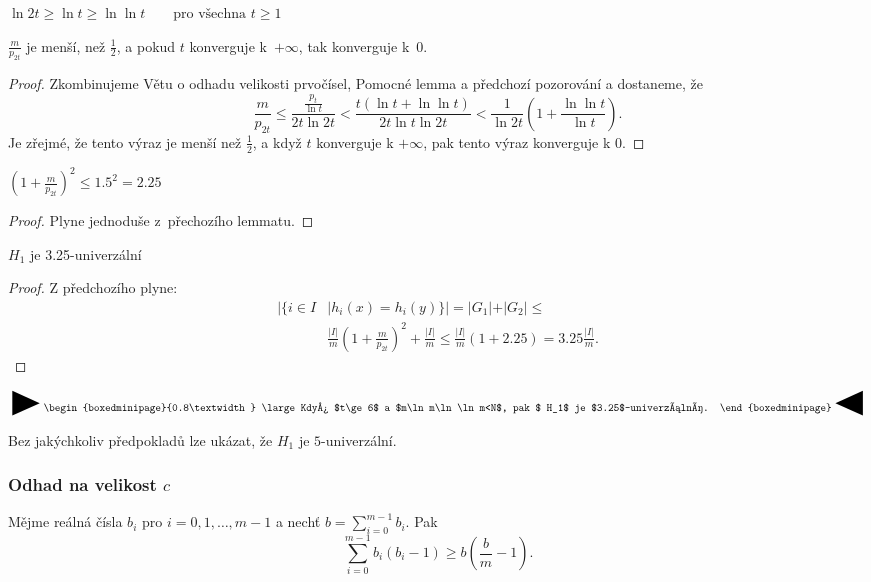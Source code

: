 \documentclass[a4paper,12pt]{article}
\newcommand{\zapamatovat}[1]{
 {
 
 \setlength\fboxrule{5pt}
 \begin{center}
 $\vcenter{
 \hbox{\raisebox{-0.8ex}{\scalebox{1.7}{\Huge\RIGHTarrow}}\begin{boxedminipage}{0.8\textwidth}
\large #1
 \end{boxedminipage}\raisebox{-0.8ex}{\scalebox{1.7}{\Huge\LEFTarrow}}}}$
 \end{center}
 }
 }
\begin{document}
\begin{pozorovani}
$\ln2t\ge\ln t\ge\ln\ln t\qquad\text{pro všechna }t\ge 1$
\end{pozorovani}

\begin{lemma}
    $\frac m{p_{2t}}$ je menší, než $\frac 12$, a pokud $t$ konverguje k~$+\infty$, tak konverguje k~$0$.
\end{lemma}
\begin{proof}
Zkombinujeme Větu o odhadu velikosti prvočísel, 
Pomocné lemma a předchozí pozorování 
a dostaneme, že
$$\frac m{p_{2t}}\le\frac {\frac {p_t}{\ln t}}{2t\ln2t}<\frac {t(\ln 
t+\ln\ln t)}{2t\ln t\ln2t}<\frac 1{\ln2t}(1+\frac {\ln\ln t}{\ln 
t}).$$
Je zřejmé, že tento výraz je menší než $\frac 
12$, 
a když $t$ konverguje k $+\infty$, pak tento výraz konverguje k $
0$.
\end{proof}

\begin{lemma}
    $(1+\frac m{p_{2t}})^2\le 1.5^2=2.25$
\end{lemma} 
\begin{proof}
    Plyne jednoduše z~přechozího lemmatu.
\end{proof}

\begin{veta}
    $H_1$ je 3.25-univerzální
\end{veta}
\begin{proof}
    Z předchozího plyne:
    \begin{align*}|\{i\in I&\mid h_i(x)=h_i(y)\}|=|G_1|+|G_2|\le\\
    &\frac {|I|}m(1+\frac m{p_{2t}})^2+\frac {|I|}m\le\frac {|I|}m(1+
    2.25)=3.25\frac {|I|}m.\end{align*}
\end{proof}

\zapamatovat{
Když $t\ge 6$ a $m\ln m\ln\ln m<N$, pak $
H_1$ je 
$3.25$-univerzální. 
}

Bez jakýchkoliv předpokladů lze 
ukázat, že $H_1$ je $5$-univerzální.

\subsubsection{Odhad na velikost $c$}

\begin{lemma}Mějme reálná čísla $b_i$ pro $i=0,1
,\dots,m-1$ a 
nechť $b=\sum_{i=0}^{m-1}b_i$. Pak 
$$\sum_{i=0}^{m-1}b_i(b_i-1)\ge b(\frac bm-1).$$
\end{lemma}
\end{document}
